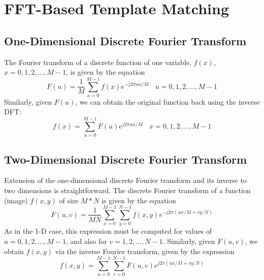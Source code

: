 \section{FFT-Based Template Matching}
\subsection{One-Dimensional Discrete Fourier Transform}
The Fourier transform of a discrete function of one variable, $f(x)$, $x = 0, 1, 2, ..., M-1$, is given by the equation
\begin{equation}
F(u) = \frac{1}{M}\sum_{x = 0}^{M - 1} f(x) e^{-j2\pi ux/M} \ \ \ \ u = 0, 1, 2, ..., M-1
\end{equation}
Similarly, given $F(u)$, we can obtain the original function back using the inverse DFT:
\begin{equation}
f(x) = \sum_{u = 0}^{M -1}F(u)e^{j2\pi ux /M} \ \ \ \ x = 0, 1, 2, ..., M - 1
\end{equation}
\subsection{Two-Dimensional Discrete Fourier Transform}
Extension of the one-dimensional discrete Fourier transform and its inverse to two dimensions is straightforward. The discrete Fourier transform of a function (image) $f(x, y)$ of size $M * N$ is given by the equation
\begin{equation}
F(u, v) = \frac{1}{MN}\sum_{x = 0}^{M - 1}\sum_{y = 0}^{N - 1}f(x, y)e^{-j2\pi(ux/M + ry/N)}
\end{equation}
As in the 1-D case, this expression must be computed for values of $u = 0, 1, 2, ..., M -1 $, and also for $v = 1, 2, ..., N -1 $. Similarly, given $F(u, v)$, we obtain $f(x, y)$ via the inverse Fourier transform, given by the expression
\begin{equation}
f(x, y) = \sum_{u = 0}^{M -1}\sum_{r = 0}^{N - 1} F(u, v)e^{j2\pi (ux/M + ry/N)}
\end{equation}

